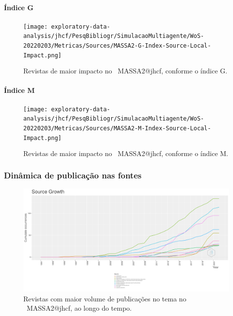 \paragraph{Índice G}

\begin{figure}
    \centering
    \texttt{[image: exploratory-data-analysis/jhcf/PesqBibliogr/SimulacaoMultiagente/WoS-20220203/Metricas/Sources/MASSA2-G-Index-Source-Local-Impact.png]}
    \caption{Revistas de maior impacto no  \dataset\ MASSA2@jhcf,  conforme o índice G.}
    \label{fig:MASSA2-G-Index-Source-Local-Impact.png}
\end{figure}

\paragraph{Índice M}

\begin{figure}
    \centering
    \texttt{[image: exploratory-data-analysis/jhcf/PesqBibliogr/SimulacaoMultiagente/WoS-20220203/Metricas/Sources/MASSA2-M-Index-Source-Local-Impact.png]}
    \caption{Revistas de maior impacto no  \dataset\ MASSA2@jhcf,  conforme o índice M.}
    \label{fig:MASSA2-M-Index-Source-Local-Impact.png}
\end{figure}

\subsubsection{Dinâmica de publicação nas fontes}

\begin{figure}
    \centering
    \includegraphics[width=1\textwidth]{exploratory-data-analysis/jhcf/PesqBibliogr/SimulacaoMultiagente/WoS-20220203/Metricas/Sources/MASSA2-Source-Dynamics.png}
    \caption{Revistas com maior volume de publicações no tema no  \dataset\ MASSA2@jhcf, ao longo do tempo.}
    \label{fig:MASSA2-Source-Dynamics.png}
\end{figure}

